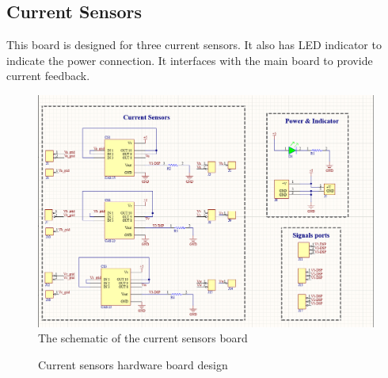 \documentclass[12pt,a4paper]{book}
\begin{document}
\subsection{Current Sensors}
This board is designed for three current sensors. It also has LED indicator to indicate the power connection. It interfaces with the main board to provide current feedback.
\begin{figure}[ht]
  \centering
  \includegraphics[width = 15cm]{image33.png}
  \caption{The schematic of the current sensors board}
  \label{fig:image33}
\end{figure}
\begin{figure}[ht!]
  \centering

  \hfill

  \caption{Current sensors hardware board design}
  \label{fig:image34}
\end{figure}
\end{document}
